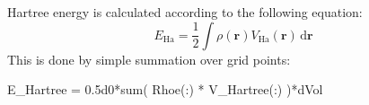 Hartree energy is calculated according to the following equation:
\begin{equation}
E_{\mathrm{Ha}} = \frac{1}{2} \int
\rho(\mathbf{r}) V_{\mathrm{Ha}}(\mathbf{r})\,\mathrm{d}\mathbf{r}
\end{equation}
This is done by simple summation over grid points:
\begin{fortrancode}
E_Hartree = 0.5d0*sum( Rhoe(:) * V_Hartree(:) )*dVol
\end{fortrancode}
